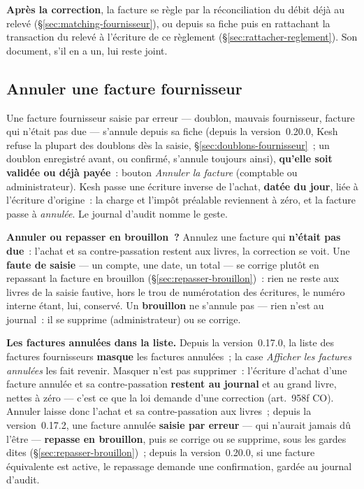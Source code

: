\documentclass[a4paper,11pt,oneside]{article}
\begin{document}
\textbf{Après la correction}, la facture se règle par la réconciliation du débit déjà au
relevé (\S\ref{sec:matching-fournisseur}), ou depuis sa fiche puis en rattachant la transaction du
relevé à l'écriture de ce règlement (\S\ref{sec:rattacher-reglement}). Son document, s'il en a un,
lui reste joint.

\subsection{Annuler une facture fournisseur}
\label{sec:annuler-facture-fournisseur}

Une facture fournisseur saisie par erreur --- doublon, mauvais fournisseur, facture qui n'était
pas due --- s'annule depuis sa fiche (depuis la version~0.20.0, Kesh refuse la plupart des
doublons dès la saisie, \S\ref{sec:doublons-fournisseur}~; un doublon enregistré avant, ou
confirmé, s'annule toujours ainsi), \textbf{qu'elle soit validée ou déjà payée}~: bouton
\emph{Annuler la facture} (comptable ou administrateur). Kesh passe une écriture inverse de
l'achat, \textbf{datée du jour}, liée à l'écriture d'origine~: la charge et l'impôt préalable
reviennent à zéro, et la facture passe à \emph{annulée}. Le journal d'audit nomme le geste.

\textbf{Annuler ou repasser en brouillon~?} Annulez une facture qui \textbf{n'était pas due}~:
l'achat et sa contre-passation restent aux livres, la correction se voit. Une \textbf{faute de
saisie} --- un compte, une date, un total --- se corrige plutôt en repassant la facture en
brouillon (\S\ref{sec:repasser-brouillon})~: rien ne reste aux livres de la saisie fautive, hors
le trou de numérotation des écritures, le numéro interne étant, lui, conservé. Un \textbf{brouillon} ne s'annule pas --- rien n'est au journal~: il se
supprime (administrateur) ou se corrige.

\textbf{Les factures annulées dans la liste.} Depuis la version~0.17.0, la liste des factures
fournisseurs \textbf{masque} les factures annulées~; la case \emph{Afficher les factures annulées}
les fait revenir. Masquer n'est pas supprimer~: l'écriture d'achat d'une facture annulée et sa
contre-passation \textbf{restent au journal} et au grand livre, nettes à zéro --- c'est ce que la
loi demande d'une correction (art.~958f CO). Annuler laisse donc l'achat et sa contre-passation
aux livres~; depuis la version~0.17.2, une facture annulée \textbf{saisie par erreur} --- qui
n'aurait jamais dû l'être --- \textbf{repasse en brouillon}, puis se corrige ou se supprime,
sous les gardes dites (\S\ref{sec:repasser-brouillon})~; depuis la version~0.20.0, si une
facture équivalente est active, le repassage demande une confirmation, gardée au journal
d'audit.
\end{document}
